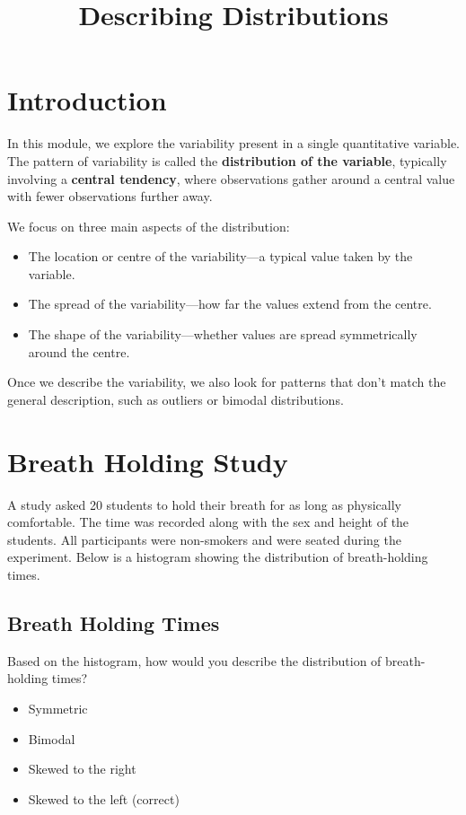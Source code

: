 \documentclass{article}
\title{Describing Distributions}
\author{}
\date{}
\begin{document}
\maketitle

\section*{Introduction}

In this module, we explore the variability present in a single quantitative variable. The pattern of variability is called the \textbf{distribution of the variable}, typically involving a \textbf{central tendency}, where observations gather around a central value with fewer observations further away.

We focus on three main aspects of the distribution:

\begin{itemize}
    \item The location or centre of the variability—a typical value taken by the variable.
    \item The spread of the variability—how far the values extend from the centre.
    \item The shape of the variability—whether values are spread symmetrically around the centre.
\end{itemize}

Once we describe the variability, we also look for patterns that don't match the general description, such as outliers or bimodal distributions.

\section*{Breath Holding Study}

A study asked 20 students to hold their breath for as long as physically comfortable. The time was recorded along with the sex and height of the students. All participants were non-smokers and were seated during the experiment. Below is a histogram showing the distribution of breath-holding times.

\subsection*{Breath Holding Times}

\noindent Based on the histogram, how would you describe the distribution of breath-holding times?

\begin{itemize}
    \item Symmetric
    \item Bimodal
    \item Skewed to the right
    \item Skewed to the left (correct)
\end{itemize}
\end{document}
